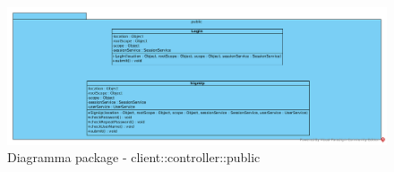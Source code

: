 \begin{center}
		\begin{figure}[H]
			\centering \includegraphics[scale=4, max width=\textwidth, max height=\myheight]{../img/diagrammiClassi/client/controller/public.png}
			\caption{Diagramma package - client::controller::public}
		\end{figure}
	\end{center}\hypertarget{client::controller::public::LogIn}{}
